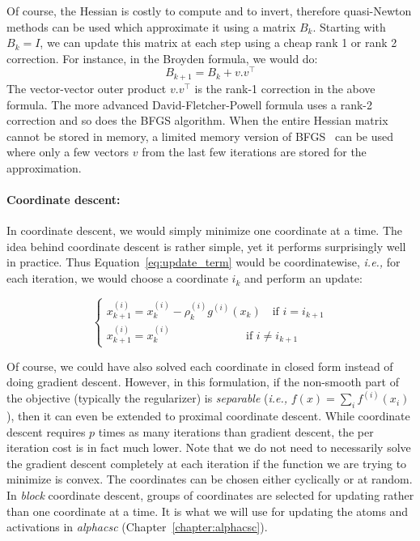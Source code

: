 Of course, the Hessian is costly to compute and to invert, therefore quasi-Newton methods can be used which approximate it using a matrix $B_k$. Starting with $B_k = I$, we can update this matrix at each step using a cheap rank 1 or rank 2 correction. For instance, in the Broyden formula, we would do:
\begin{equation}
B_{k+1} = B_k + v.v^\top
\end{equation}
The vector-vector outer product $v.v^\top$ is the rank-1 correction in the above formula. The more advanced David-Fletcher-Powell formula uses a rank-2 correction and so does the \ac{BFGS} algorithm. When the entire Hessian matrix cannot be stored in memory, a limited memory version of BFGS~\citep{wright1999numerical} can be used where only a few vectors $v$ from the last few iterations are stored for the approximation.

\paragraph{Coordinate descent:}
In coordinate descent, we would simply minimize one coordinate at a time. The idea behind coordinate descent is rather simple, yet it performs surprisingly well in practice. Thus  Equation~\ref{eq:update_term} would be coordinatewise, \textit{i.e.,} for each iteration, we would choose a coordinate $i_k$ and perform an update:

\begin{equation}
\begin{cases}
x^{(i)}_{k+1} = x^{(i)}_{k} - \rho^{(i)}_k g^{(i)}(x_k) \quad \text{if } i=i_{k+1}\\
x^{(i)}_{k+1} = x^{(i)}_{k} \hspace{80pt} \text{if } i \neq i_{k+1}
\end{cases}
\end{equation}

Of course, we could have also solved each coordinate in closed form instead of doing gradient descent. However, in this formulation, if the non-smooth part of the objective (typically the regularizer) is \emph{separable} (\textit{i.e.,} $f(x) = \sum_i f^{(i)}(x_i)$), then it can even be extended to proximal coordinate descent. 
While coordinate descent requires $p$ times as many iterations than gradient descent, the per iteration cost is in fact much lower. Note that we do not need to necessarily solve the gradient descent completely at each iteration if the function we are trying to minimize is convex. The coordinates can be chosen either cyclically or at random. In \emph{block} coordinate descent, groups of coordinates are selected for updating rather than one coordinate at a time. It is what we will use for updating the atoms and activations in \emph{alphacsc} (Chapter~\ref{chapter:alphacsc}).


